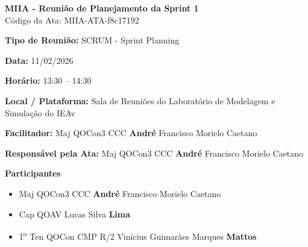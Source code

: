 \documentclass[12pt,a4paper]{article}
\newcommand{\meetingtitle}{}
\newcommand{\meetingtype}{}
\newcommand{\meetingdate}{}
\newcommand{\meetingtime}{}
\newcommand{\meetinglocation}{}
\newcommand{\facilitator}{}
\newcommand{\notetaker}{}
\newcommand{\participants}{}
\newcommand{\meetingobjective}{}
\newcommand{\meetingcode}{}
\newcommand{\companyname}{}
\newcommand{\setmeetingtitle}[1]{\renewcommand{\meetingtitle}{#1}}
\newcommand{\setmeetingtype}[1]{\renewcommand{\meetingtype}{#1}}
\newcommand{\setmeetingdate}[1]{\renewcommand{\meetingdate}{#1}}
\newcommand{\setmeetingtime}[1]{\renewcommand{\meetingtime}{#1}}
\newcommand{\setmeetinglocation}[1]{\renewcommand{\meetinglocation}{#1}}
\newcommand{\setfacilitator}[1]{\renewcommand{\facilitator}{#1}}
\newcommand{\setnotetaker}[1]{\renewcommand{\notetaker}{#1}}
\newcommand{\setparticipants}[1]{\renewcommand{\participants}{#1}}
\newcommand{\setobjective}[1]{\renewcommand{\meetingobjective}{#1}}
\newcommand{\setmeetingcode}[1]{\renewcommand{\meetingcode}{#1}}
\newcommand{\setcompanyname}[1]{\renewcommand{\companyname}{#1}}
\begin{document}
\setmeetingcode{MIIA-ATA-f8c17192}

\setmeetingtitle{MIIA - Reunião de Planejamento da Sprint 1}
\setmeetingtype{SCRUM - Sprint Planning}
\setmeetingdate{11/02/2026}
\setmeetingtime{13:30 -- 14:30}
\setmeetinglocation{Sala de Reuniões do Laboratório de Modelagem e Simulação do IEAv}
\setfacilitator{Maj QOCon3 CCC \textbf{André} Francisco Morielo Caetano}
\setnotetaker{Maj QOCon3 CCC \textbf{André} Francisco Morielo Caetano}
\setcompanyname{Instituto de Estudos Avançados (IEAv)}

\setparticipants{
\begin{itemize}
\item Maj QOCon3 CCC \textbf{André} Francisco Morielo Caetano
\item Cap QOAV Lucas Silva \textbf{Lima}
\item 1\textsuperscript{o} Ten QOCon CMP R/2 Vinícius Guimarães Marques \textbf{Mattos}
\end{itemize}
}

\setobjective{Revisar os cards (atividades) previstas para Sprint, tendo em vista o objetivo maior (EPIC) proposto pela equipe: produzir um documento ``MIIA v1.0'' com design de alto e baixo nível como \emph{blueprint} para a arquitetura que iremos implementar depois}


\begin{center}
{\Large \textbf{\meetingtitle}}\\
\vspace{0.3em}
{\small Código da Ata: \meetingcode}
\end{center}

\vspace{1em}

\textbf{Tipo de Reunião:} \meetingtype

\textbf{Data:} \meetingdate

\textbf{Horário:} \meetingtime

\textbf{Local / Plataforma:} \meetinglocation

\textbf{Facilitador:} \facilitator

\textbf{Responsável pela Ata:} \notetaker

\vspace{1em}

\textbf{Participantes}

\participants

\vspace{1em}
\end{document}
